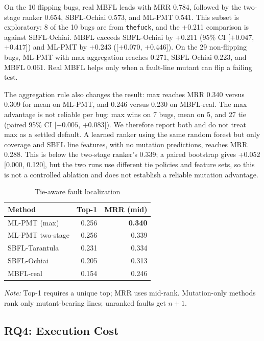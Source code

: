 \documentclass[10pt,conference]{IEEEtran}
\begin{document}
On the 10 flipping bugs, real MBFL leads with MRR 0.784, followed by the two-stage ranker 0.654, SBFL-Ochiai 0.573, and ML-PMT 0.541. This subset is exploratory: 8 of the 10 bugs are from \texttt{thefuck}, and the +0.211 comparison is against SBFL-Ochiai. MBFL exceeds SBFL-Ochiai by +0.211 (95\% CI [$+0.047$, $+0.417$]) and ML-PMT by +0.243 ([$+0.070$, $+0.446$]). On the 29 non-flipping bugs, ML-PMT with max aggregation reaches 0.271, SBFL-Ochiai 0.223, and MBFL 0.061. Real MBFL helps only when a fault-line mutant can flip a failing test.

The aggregation rule also changes the result: max reaches MRR 0.340 versus 0.309 for mean on ML-PMT, and 0.246 versus 0.230 on MBFL-real. The max advantage is not reliable per bug: max wins on 7 bugs, mean on 5, and 27 tie (paired 95\% CI [$-0.005$, $+0.083$]). We therefore report both and do not treat max as a settled default. A learned ranker using the same random forest but only coverage and SBFL line features, with no mutation predictions, reaches MRR 0.288. This is below the two-stage ranker’s 0.339; a paired bootstrap gives +0.052 [0.000, 0.120], but the two runs use different tie policies and feature sets, so this is not a controlled ablation and does not establish a reliable mutation advantage.

\begin{table}[t]
\centering
\caption{Tie-aware fault localization}
\label{tab:localization}
\footnotesize
\begin{tabular}{lrr}
\toprule
Method & Top-1 & MRR (mid) \\
\midrule
ML-PMT (max) & 0.256 & \textbf{0.340} \\
ML-PMT two-stage & 0.256 & 0.339 \\
SBFL-Tarantula & 0.231 & 0.334 \\
SBFL-Ochiai & 0.205 & 0.313 \\
MBFL-real & 0.154 & 0.246 \\
\bottomrule
\end{tabular}

\vspace{1mm}
\parbox{0.95\columnwidth}{\footnotesize
\textit{Note:} Top-1 requires a unique top; MRR uses mid-rank. Mutation-only methods rank only mutant-bearing lines; unranked faults get $n+1$.
}
\end{table}

\subsection{RQ4: Execution Cost}
\end{document}

